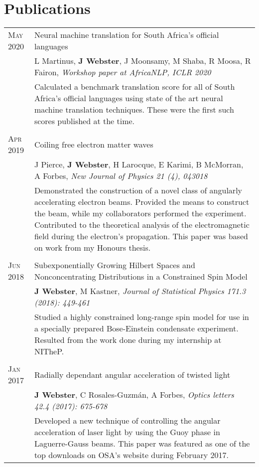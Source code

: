 \section{Publications}

\begin{supertabular}{p{1.8cm}|p{12cm}}
	\textsc{May 2020} & Neural machine translation for South Africa's official languages \\
	& \small{L Martinus, \textbf{J Webster}, J Moonsamy, M Shaba, R Moosa, R Fairon, \emph{Workshop paper at AfricaNLP, ICLR 2020}} \\
	& \footnotesize{Calculated a benchmark translation score for all of South Africa's official languages using state of the art neural machine translation techniques. These were the first such scores published at the time.} \\
	 \\
	\textsc{Apr 2019} & Coiling free electron matter waves \\
	& \small{J Pierce, \textbf{J Webster}, H Larocque, E Karimi, B McMorran, A Forbes, \emph{New Journal of Physics 21 (4), 043018}} \\
	& \footnotesize{Demonstrated the construction of a novel class of angularly accelerating electron beams. Provided the means to construct the beam, while my collaborators performed the experiment. Contributed to the theoretical analysis of the electromagnetic field during the electron’s propagation. This paper was based on work from my Honours thesis.} \\
	 \\
	\textsc{Jun 2018} & Subexponentially Growing Hilbert Spaces and Nonconcentrating Distributions in a Constrained Spin Model \\
	& \small{\textbf{J Webster}, M Kastner, \emph{Journal of Statistical Physics 171.3 (2018): 449-461}} \\
	& \footnotesize{Studied a highly constrained long-range spin model for use in a specially prepared Bose-Einstein condensate experiment. Resulted from the work done during my internship at NITheP.} \\
	 \\
	\textsc{Jan 2017} & Radially dependant angular acceleration of twisted light \\
	& \small{\textbf{J Webster}, C Rosales-Guzm\'an, A Forbes, \emph{Optics letters 42.4 (2017): 675-678}} \\
	& \footnotesize{Developed a new technique of controlling the angular acceleration of laser light by using the Guoy phase in Laguerre-Gauss beams. This paper was featured as one of the top downloads on OSA’s website during February 2017.} \\
\end{supertabular}